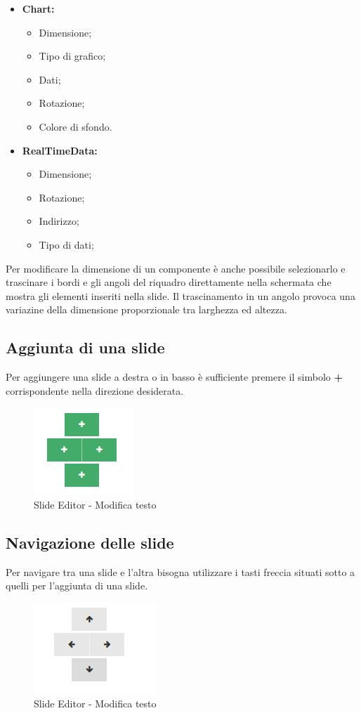 \begin{itemize}
	\item \textbf{Chart:}
		\begin{itemize}
			\item Dimensione;
			\item Tipo di grafico;
			\item Dati;
			\item Rotazione;
			\item Colore di sfondo.
		\end{itemize}
	
	\item \textbf{RealTimeData:}
		\begin{itemize}
			\item Dimensione;
			\item Rotazione;
			\item Indirizzo;
			\item Tipo di dati;
		\end{itemize}
\end{itemize}

\noindent Per modificare la dimensione di un componente è anche possibile selezionarlo e trascinare i bordi e gli angoli del riquadro direttamente nella schermata che mostra gli elementi inseriti nella \gls{slide}. Il trascinamento in un angolo provoca una variazine della dimensione proporzionale tra larghezza ed altezza. 
 
\subsection{Aggiunta di una slide}
Per aggiungere una \gls{slide} a destra o in basso è sufficiente premere il simbolo \textbf{+} corrispondente nella direzione desiderata.
\begin{figure}[h] 
      \centering 
      \includegraphics[scale=0.37] {img/piu.png}
      \caption{Slide Editor - Modifica testo} 
  \end{figure}
\subsection{Navigazione delle slide}
Per navigare tra una \gls{slide} e l'altra bisogna utilizzare i tasti freccia situati sotto a quelli per l'aggiunta di una \gls{slide}.
\begin{figure}[h] 
		    \centering 
		    \includegraphics[scale=0.37] {img/frecce.png}
		    \caption{Slide Editor - Modifica testo} 
		\end{figure}
